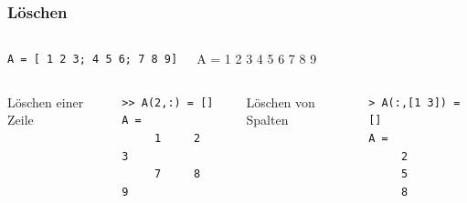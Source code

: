 \documentclass[hyperref={xetex}]{beamer}
\begin{document}
%
%
\begin{frame}[fragile]\frametitle{Löschen}
\begin{columns}[c]%
%
\begin{lstlisting}[basicstyle=\tiny]
A = [ 1 2 3; 4 5 6; 7 8 9]
\end{lstlisting} 
\begin{matlab}
A =
     1     2     3
     4     5     6
     7     8     9 
\end{matlab}%
\end{columns}%
\begin{columns}[t]
%
Löschen einer Zeile
\begin{lstlisting}
>> A(2,:) = []
A =
     1     2     3
     7     8     9
\end{lstlisting}
%
Löschen von Spalten
\begin{lstlisting}
> A(:,[1 3]) = []
A =
     2
     5
     8
\end{lstlisting}
\end{columns}
\end{frame}
\end{document}
